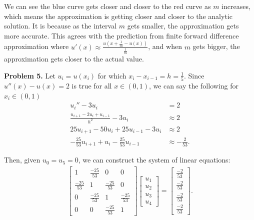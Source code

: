 \documentclass{article}
\begin{document}
\begin{enumerate}[label=(\alph*)]
    We can see the blue curve gets closer and closer to the red curve as $m$ increases, which means the approximation is getting closer and closer to the analytic solution.
    It is because as the interval $m$ gets smaller, the approximation gets more accurate.
    This agrees with the prediction from finite forward difference approximation where $u'(x) \approx \frac{u(x+\frac{1}{m}-u(x))}{\frac{1}{m}}$, and when $m$ gets bigger, the approximation gets closer to the actual value.
\end{enumerate}
\bigbreak

\textbf{Problem 5.}
Let $u_i = u(x_i)$ for which $x_i - x_{i-1} = h = \frac{1}{5}$.
Since $u''(x) - u(x) = 2$ is true for all $x \in (0,1)$, we can say the following for $x_i \in (0,1)$
\begin{align}
    u_i''-3u_i & =2 \nonumber\\
    \frac{u_{i+1}-2u_i+u_{i-1}}{h^2}-3u_i& \approx2 \nonumber\\
    25u_{i+1}-50u_i+25u_{i-1}-3u_i& \approx2 \nonumber\\
    -\frac{25}{53}u_{i+1} + u_i  - \frac{25}{53}u_{i-1} & \approx - \frac{2}{53}. \nonumber
\end{align}

Then, given $u_0=u_5=0$, we can construct the system of linear equations:
\begin{align}
    \begin{bmatrix}
        1 & \frac{-25}{53} & 0 & 0 \\
        \frac{-25}{53} & 1 & \frac{-25}{53} & 0 \\
        0 & \frac{-25}{53} & 1 & \frac{-25}{53} \\
        0 & 0 & \frac{-25}{53} & 1
    \end{bmatrix}
    \begin{bmatrix} 
        u_1 \\ 
        u_2 \\ 
        u_3 \\ 
        u_4 
    \end{bmatrix} = 
    \begin{bmatrix} 
        \frac{-2}{53} \\ 
        \frac{-2}{53} \\ 
        \frac{-2}{53} \\ 
        \frac{-2}{53}
    \end{bmatrix}. \nonumber
\end{align}
\end{document}
